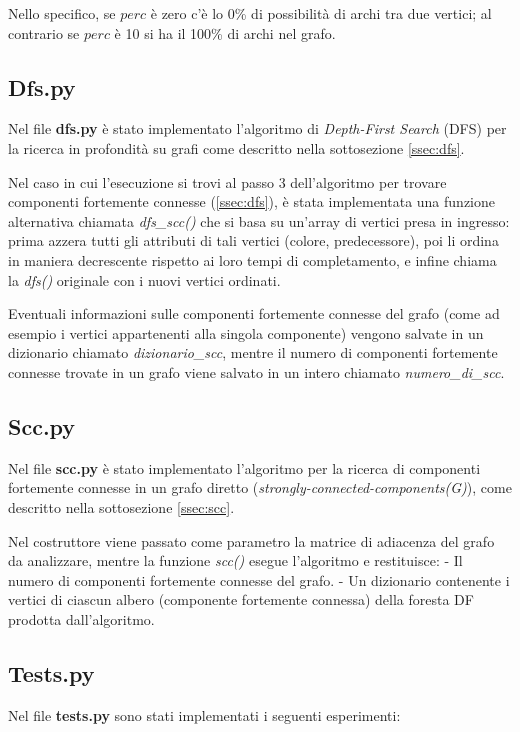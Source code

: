 \documentclass[a4paper,12pt]{article}
\begin{document}
Nello specifico, se $perc$ è zero c'è lo 0\% di possibilità di archi tra due vertici; al contrario se $perc$ è 10 si ha il 100\% di archi nel grafo.

\subsection{Dfs.py}
Nel file \textbf{dfs.py} è stato implementato l'algoritmo di \textit{Depth-First Search} (DFS) per la ricerca in profondità su grafi come descritto nella sottosezione \ref{ssec:dfs}.
\newline

Nel caso in cui l'esecuzione si trovi al passo 3 dell'algoritmo per trovare componenti fortemente connesse (\ref{ssec:dfs}), è stata implementata una funzione alternativa chiamata \textit{dfs\_scc()} che si basa su un'array di vertici presa in ingresso: prima azzera tutti gli attributi di tali vertici (colore, predecessore), poi li ordina in maniera decrescente rispetto ai loro tempi di completamento, e infine chiama la \textit{dfs()} originale con i nuovi vertici ordinati.

Eventuali informazioni sulle componenti fortemente connesse del grafo (come ad esempio i vertici appartenenti alla singola componente) vengono salvate in un dizionario chiamato \textit{dizionario\_scc}, mentre il numero di componenti fortemente connesse trovate in un grafo viene salvato in un intero chiamato \textit{numero\_di\_scc}.

\subsection{Scc.py}
Nel file \textbf{scc.py} è stato implementato l'algoritmo per la ricerca di componenti fortemente connesse in un grafo diretto (\textit{strongly-connected-components(G)}), come descritto nella sottosezione \ref{ssec:scc}.

Nel costruttore viene passato come parametro la matrice di adiacenza del grafo da analizzare, mentre la funzione \textit{scc()} esegue l'algoritmo e restituisce:
\newline
- Il numero di componenti fortemente connesse del grafo. \newline
- Un dizionario contenente i vertici di ciascun albero (componente fortemente connessa) della foresta DF prodotta dall'algoritmo.

\subsection{Tests.py}
Nel file \textbf{tests.py} sono stati implementati i seguenti esperimenti:
\newline
\end{document}

